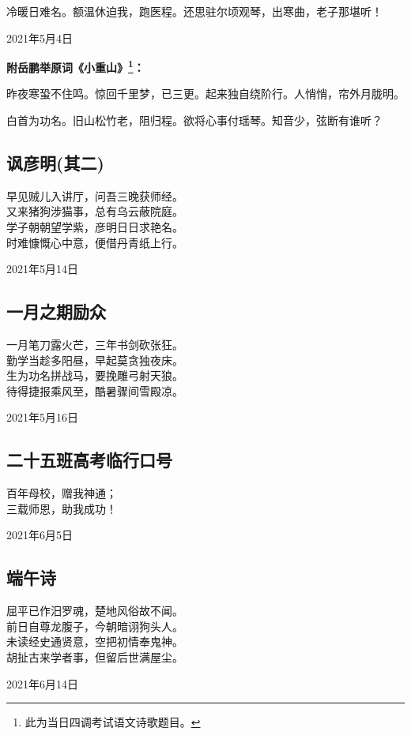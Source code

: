 \documentclass[a5paper]{ctexart}
\begin{document}
	冷暖日难名。额温休迫我，跑医程。还思驻尔顷观琴，出寒曲，老子那堪听！
	\begin{flushright}
		2021年5月4日
	\end{flushright}
	\begin{flushleft}
	\textbf{附岳鹏举原词《小重山》\footnote{此为当日四调考试语文诗歌题目。}：}
	\end{flushleft}
	
	昨夜寒蛩不住鸣。惊回千里梦，已三更。起来独自绕阶行。人悄悄，帘外月胧明。
	
	白首为功名。旧山松竹老，阻归程。欲将心事付瑶琴。知音少，弦断有谁听？
	
	\subsection{讽彦明(其二)}
	\begin{center}
		早见贼儿入讲厅，问吾三晚获师经。\\
		又来猪狗涉猫事，总有乌云蔽院庭。\\
		学子朝朝望学紫，彦明日日求艳名。\\
		时难慷慨心中意，便借丹青纸上行。
	\end{center}
	\begin{flushright}
		2021年5月14日
	\end{flushright}

	\subsection{一月之期励众}
	\begin{center}
		一月笔刀露火芒，三年书剑砍张狂。\\
		勤学当趁多阳昼，早起莫贪独夜床。\\
		生为功名拼战马，要挽雕弓射天狼。\\
		待得捷报乘风至，酷暑骤间雪殿凉。
	\end{center}
	\hfill 2021年5月16日
	
	\subsection{二十五班高考临行口号}
	\begin{center}
		百年母校，赠我神通；\\
		三载师恩，助我成功！
	\end{center}
	\hfill 2021年6月5日
	
	
	\subsection{端午诗}
	\begin{center}
		屈平已作汨罗魂，楚地风俗故不闻。\\
		前日自尊龙腹子，今朝暗诩狗头人。\\
		未读经史通贤意，空把初情奉鬼神。\\
		胡扯古来学者事，但留后世满屋尘。
		
	\end{center}
	\hfill 2021年6月14日
	
\end{document}

